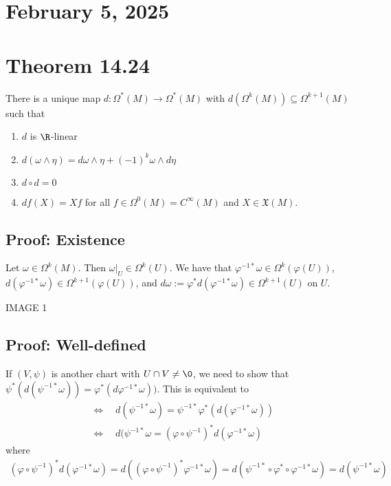 \documentclass[11pt]{article}
\begin{document}
\section*{February 5, 2025}
\label{sec:org226d8ba}
\section*{Theorem 14.24}
\label{sec:org3f8298b}
There is a unique map \(d:\Omega^{*}(M)\to\Omega^{*}(M)\) with \(d(\Omega^{k}(M))\subseteq\Omega^{k+1}(M)\) such that\\
\begin{enumerate}
\item \(d\) is \(\R\)-linear\\
\item \(d(\omega\wedge\eta)=d\omega\wedge\eta+(-1)^{k}\omega\wedge d\eta\)\\
\item \(d\circ d=0\)\\
\item \(df(X)=Xf\) for all \(f\in\Omega^{0}(M)=C^{\infty}(M)\) and \(X\in\mathfrak{X}(M)\).\\
\end{enumerate}
\subsection*{Proof: Existence}
\label{sec:org2291771}
Let \(\omega\in\Omega^{k}(M)\). Then \(\omega|_{U}\in\Omega^{k}(U)\). We have that \(\varphi^{-1*}\omega\in\Omega^{k}(\varphi(U))\), \(d(\varphi^{-1*}\omega)\in\Omega^{k+1}(\varphi(U))\), and \(d\omega:=\varphi^{*}d(\varphi^{-1*}\omega)\in\Omega^{k+1}(U)\) on \(U\).\\
\begin{center}
IMAGE 1\\
\end{center}
\subsection*{Proof: Well-defined}
\label{sec:org751b326}
If \((V,\psi)\) is another chart with \(U\cap V\neq\0\), we need to show that \(\psi^{*}(d(\psi^{-1*}\omega))=\varphi^{*}(d\varphi^{-1*}\omega))\). This is equivalent to\\
\begin{align*}
  &\iff\quad d(\psi^{-1*}\omega)=\psi^{-1*}\varphi^{*}(d(\varphi^{-1*}\omega)) \\
  &\iff\quad d(\psi^{-1*}\omega=(\varphi\circ\psi^{-1})^{*}d(\varphi^{-1*}\omega)
\end{align*}
where\\
\begin{align*}
  (\varphi\circ\psi^{-1})^{*}d(\varphi^{-1*}\omega)
  =d((\varphi\circ\psi^{-1})^{*}\varphi^{-1*}\omega)
  =d(\psi^{-1*}\circ\varphi^{*}\circ\varphi^{-1*}\omega)
  =d(\psi^{-1*}\omega)
\end{align*}
\end{document}
